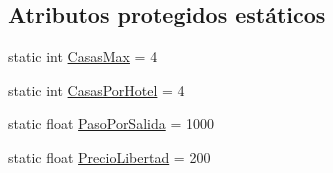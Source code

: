 \subsection*{Atributos protegidos estáticos}
\begin{DoxyCompactItemize}
\item 
static int \hyperlink{classcivitas_1_1Jugador_accf59fcd81d2ef278ff30ec2d94459f7}{Casas\+Max} = 4
\item 
static int \hyperlink{classcivitas_1_1Jugador_a784c20415185896630b61dc4e32c2ad4}{Casas\+Por\+Hotel} = 4
\item 
static float \hyperlink{classcivitas_1_1Jugador_a7bf24661b9223d34e9e0b8640183de67}{Paso\+Por\+Salida} = 1000
\item 
static float \hyperlink{classcivitas_1_1Jugador_a2903b8379dc2dfcccab28821a41c7afc}{Precio\+Libertad} = 200
\end{DoxyCompactItemize}
